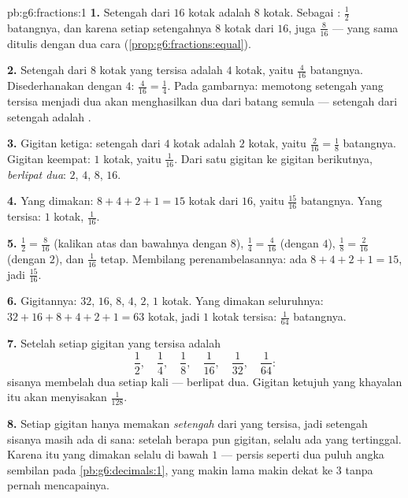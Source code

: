 \begin{solution}{pb:g6:fractions:1}
\textbf{1.} Setengah dari $16$ kotak adalah $8$ kotak. Sebagai
: $\frac12$ batangnya, dan karena setiap setengahnya $8$ kotak
dari $16$, juga $\frac{8}{16}$ ---  yang sama ditulis dengan
dua cara (\cref{prop:g6:fractions:equal}).

\textbf{2.} Setengah dari $8$ kotak yang tersisa adalah $4$ kotak,
yaitu $\frac{4}{16}$ batangnya. Disederhanakan dengan $4$:
$\frac{4}{16} = \frac14$. Pada gambarnya: memotong setengah yang
tersisa menjadi dua akan menghasilkan dua  dari batang
semula --- setengah dari setengah adalah .

\textbf{3.} Gigitan ketiga: setengah dari $4$ kotak adalah $2$ kotak,
yaitu $\frac{2}{16} = \frac18$ batangnya. Gigitan keempat: $1$ kotak,
yaitu $\frac{1}{16}$. Dari satu gigitan ke gigitan berikutnya,
 \emph{berlipat dua}: $2$, $4$, $8$, $16$.

\textbf{4.} Yang dimakan: $8 + 4 + 2 + 1 = 15$ kotak dari $16$, yaitu
$\frac{15}{16}$ batangnya. Yang tersisa: $1$ kotak, $\frac{1}{16}$.

\textbf{5.} $\frac12 = \frac{8}{16}$ (kalikan atas dan bawahnya dengan
$8$), $\frac14 = \frac{4}{16}$ (dengan $4$), $\frac18 = \frac{2}{16}$
(dengan $2$), dan $\frac{1}{16}$ tetap. Membilang perenambelasannya:
ada $8 + 4 + 2 + 1 = 15$, jadi  $\frac{15}{16}$.

\textbf{6.} Gigitannya: $32$, $16$, $8$, $4$, $2$, $1$ kotak. Yang
dimakan seluruhnya: $32 + 16 + 8 + 4 + 2 + 1 = 63$ kotak, jadi $1$
kotak tersisa: $\frac{1}{64}$ batangnya.

\textbf{7.} Setelah setiap gigitan yang tersisa adalah
\[
\frac12,\quad \frac14,\quad \frac18,\quad \frac{1}{16},\quad
\frac{1}{32},\quad \frac{1}{64} :
\]
sisanya membelah dua setiap kali ---  berlipat dua.
Gigitan ketujuh yang khayalan itu akan menyisakan $\frac{1}{128}$.

\textbf{8.} Setiap gigitan hanya memakan \emph{setengah} dari yang
tersisa, jadi setengah sisanya masih ada di sana: setelah berapa pun
gigitan, selalu ada yang tertinggal. Karena itu  yang dimakan
selalu di bawah $1$ --- persis seperti dua puluh angka sembilan pada
\cref{pb:g6:decimals:1}, yang makin lama makin dekat ke $3$ tanpa
pernah mencapainya.


\end{solution}
